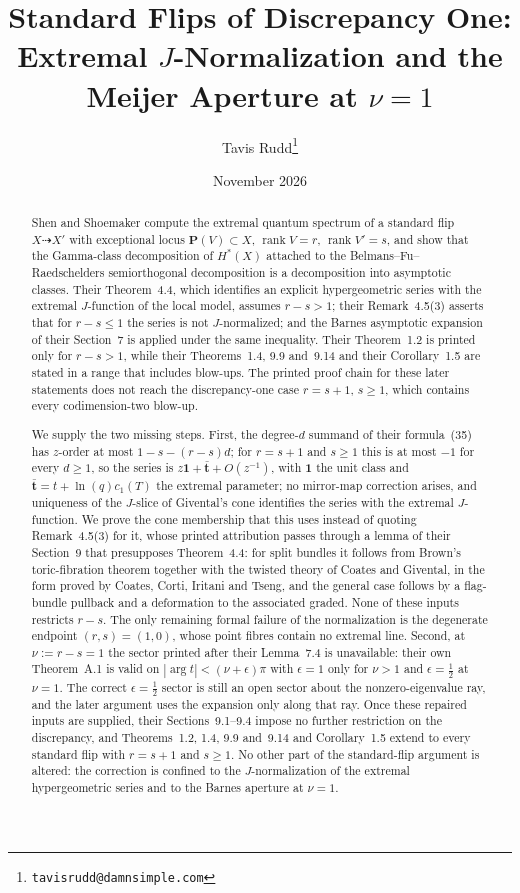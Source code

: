 \documentclass[11pt]{article}
\title{Standard Flips of Discrepancy One: Extremal \(J\)-Normalization
  and the Meijer Aperture at \(\nu=1\)}
\author{Tavis Rudd\thanks{\texttt{tavisrudd@damnsimple.com}}}
\date{November 2026}
\theoremstyle{definition}
\theoremstyle{remark}
\newcommand{\PP}{\mathbf P}
\newcommand{\one}{\mathbf 1}
\newcommand{\rk}{\operatorname{rank}}
\begin{document}
\maketitle

\begin{abstract}
Shen and Shoemaker compute the extremal quantum spectrum of a standard flip
\(X\dashrightarrow X'\) with exceptional locus \(\PP(V)\subset X\),
\(\rk V=r\), \(\rk V'=s\), and show that the Gamma-class decomposition of
\(H^{*}(X)\) attached to the Belmans--Fu--Raedschelders semiorthogonal
decomposition is a decomposition into asymptotic classes.  Their Theorem~4.4,
which identifies an explicit hypergeometric series with the extremal
\(J\)-function of the local model, assumes \(r-s>1\); their Remark~4.5(3)
asserts that for \(r-s\le1\) the series is not \(J\)-normalized; and the
Barnes asymptotic expansion of their Section~7 is applied under the same
inequality.  Their Theorem~1.2 is printed only for \(r-s>1\), while their
Theorems~1.4, 9.9 and~9.14 and their Corollary~1.5 are stated in a range that
includes blow-ups.  The printed proof chain for these later statements does
not reach the discrepancy-one case \(r=s+1\), \(s\ge1\), which contains every
codimension-two blow-up.

We supply the two missing steps.  First, the degree-\(d\) summand of their
formula~(35) has \(z\)-order at most \(1-s-(r-s)d\); for \(r=s+1\) and
\(s\ge1\) this is at most \(-1\) for every \(d\ge1\), so the series is
\(z\one+\bar{\mathbf t}+O(z^{-1})\), with \(\one\) the unit class and
\(\bar{\mathbf t}=t+\ln(q)c_{1}(T)\) the extremal parameter; no mirror-map
correction arises, and
uniqueness of the \(J\)-slice of Givental's cone identifies the series with
the extremal \(J\)-function.  We prove the cone membership that this uses
instead of quoting Remark~4.5(3) for it, whose printed attribution passes
through a lemma of their Section~9 that presupposes Theorem~4.4: for split
bundles it follows from
Brown's toric-fibration theorem together with the twisted theory of
Coates and Givental, in the form proved by Coates, Corti, Iritani and Tseng,
and the general case follows by a flag-bundle pullback
and a deformation to the associated graded.  None of these inputs restricts
\(r-s\).  The only remaining formal failure of the normalization is the
degenerate endpoint \((r,s)=(1,0)\), whose point fibres contain
no extremal line.  Second, at \(\nu:=r-s=1\) the
sector printed after their Lemma~7.4 is unavailable: their own Theorem~A.1
is valid on \(|\arg t|<(\nu+\epsilon)\pi\) with \(\epsilon=1\) only for
\(\nu>1\) and \(\epsilon=\tfrac12\) at \(\nu=1\).  The correct
\(\epsilon=\tfrac12\) sector is still an open sector about the
nonzero-eigenvalue ray, and the later argument uses the expansion only along
that ray.  Once these repaired inputs are supplied, their Sections~9.1--9.4 impose
no further restriction on the discrepancy, and Theorems~1.2, 1.4, 9.9
and~9.14 and Corollary~1.5 extend to every standard flip with
\(r=s+1\) and \(s\ge1\).  No other part of the standard-flip argument is
altered: the correction is confined to the \(J\)-normalization of the extremal
hypergeometric series and to the Barnes aperture at \(\nu=1\).
\end{abstract}
\end{document}
